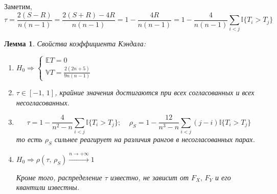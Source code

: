 \documentclass[a4paper,12pt]{article}
\theoremstyle{plain}
\newtheorem{lemma}{Лемма}[section]
\theoremstyle{definition}
\theoremstyle{remark}
\begin{document}
Заметим, 
\[
  \tau = \frac{2(S - R)}{n(n - 1)} = \frac{2(S + R) - 4R}{n(n - 1)} = 1 - \frac{4R}{n(n - 1)} = 1 - \frac{4}{n(n - 1)}\sum_{i < j}\mathbb{I}\{T_i > T_j\}
\]
\begin{lemma}
  Свойства коэффициента Кэндала:
  \begin{enumerate}
    \item $H_0 \Rightarrow \begin{cases}
      \mathbb{E}T = 0\\
      \mathbb{V}T = \frac{2(2n + 5)}{9n(n - 1)}
    \end{cases}$
    \item $\tau \in [-1,\,1]$, крайние значения достигаются при всех согласованных и всех несогласованных.
    \item \[
      \tau = 1 - \frac{4}{n^2 - n}\sum_{i < j}\mathbb{I}\{T_i > T_j\};\;\;\;\; \rho_S = 1 - \frac{12}{n^3 - n}\sum_{i < j}(j - i)\mathbb{I}\{T_i > T_j\}
    \]
    то есть $\rho_S$ сильнее реагирует на различия рангов в несогласованных парах.
    \item $H_0 \Rightarrow \rho(\tau,\, \rho_S) \overset{n \to +\infty}{\to} 1$
    
    Кроме того, распределение $\tau$ известно, не зависит от $F_X,\, F_Y$ и его квантили известны.
  \end{enumerate}
\end{lemma}
\end{document}
